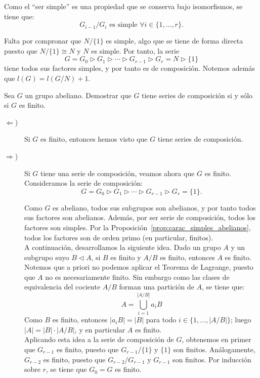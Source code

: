 \begin{ejercicio}
    Como el ``ser simple'' es una propiedad que se conserva bajo isomorfismos, se tiene que:
    \begin{equation*}
        G_{i-1}/G_i \text{ es simple } \forall i\in \{1,\ldots,r\}.
    \end{equation*}

    Falta por compronar que $N/\{1\}$ es simple, algo que se tiene de forma directa puesto que $N/\{1\}\cong N$ y $N$ es simple. Por tanto, la serie
    \[
        G = G_0 \rhd G_1 \rhd \cdots \rhd G_{r-1} \rhd G_r = N \rhd \{1\}
    \]
    tiene todos sus factores simples, y por tanto es de composición. Notemos además que $l(G)=l(G/N)+1$.    
\end{ejercicio}

\begin{ejercicio}
    Sea $G$ un grupo abeliano. Demostrar que $G$ tiene series de composición si y sólo si $G$ es finito.
    \begin{description}
        \item[$\Longleftarrow$)] Si $G$ es finito, entonces hemos visto que $G$ tiene series de composición.
        
        \item[$\Longrightarrow$)] Si $G$ tiene una serie de composición, veamos ahora que $G$ es finito. Consideramos la serie de composición:
        \[
            G = G_0 \rhd G_1 \rhd \cdots \rhd G_{r-1} \rhd G_r = \{1\}.
        \]

        Como $G$ es abeliano, todos sus subgrupos son abelianos, y por tanto todos sus factores son abelianos. Además, por ser serie de composición, todos los factores son simples. Por la Proposición~\ref{prop:carac_simples_abelianos}, todos los factores son de orden primo (en particular, finitos).\\

        A continuación, desarrollamos la siguiente idea. Dado un grupo $A$ y un subgrupo suyo $B\lhd A$, si $B$ es finito y $A/B$ es finito, entonces $A$ es finito. Notemos que a priori no podemos aplicar el Teorema de Lagrange, puesto que $A$ no es necesariamente finito. Sin embargo como las clases de equivalencia del cociente $A/B$ forman una partición de $A$, se tiene que:
        \begin{equation*}
            A=\bigcup_{i=1}^{|A/B|} a_iB
        \end{equation*}
        Como $B$ es finito, entonces $|a_iB|=|B|$ para todo $i\in \{1,\ldots,|A/B|\}$; luego $|A|=|B|\cdot |A/B|$, y en particular $A$ es finito.\\

        Aplicando esta idea a la serie de composición de $G$, obtenemos en primer que $G_{r-1}$ es finito, puesto que $G_{r-1}/\{1\}$ y $\{1\}$ son finitos. Análogamente, $G_{r-2}$ es finito, puesto que $G_{r-2}/G_{r-1}$ y $G_{r-1}$ son finitos. Por inducción sobre $r$, se tiene que $G_{0}=G$ es finito.
    \end{description}
\end{ejercicio}

